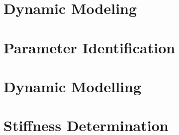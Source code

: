 \documentclass[12pt,twoside]{report}
\begin{document}

\thispagestyle{empty}



%

\tableofcontents

\cleardoublepage

\cleardoublepage







%

\chapter{Dynamic Modeling}

\cleardoublepage

\chapter{Parameter Identification}

\cleardoublepage


%


%

%

%




\newpage


\cleardoublepage


\appendix
\chapter{Dynamic Modelling}



\appendix
\chapter{Stiffness Determination}

\end{document}
